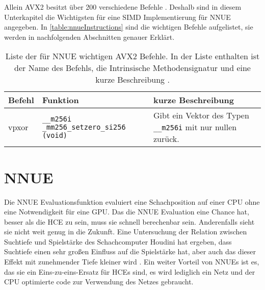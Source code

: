Allein \ac{AVX2} besitzt über 200 verschiedene Befehle \cite{intelIntrinsics}. Deshalb sind in diesem Unterkapitel die Wichtigsten für eine \ac{SIMD} Implementierung für NNUE angegeben. In \autoref{table:nnueInstructions} sind die wichtigen Befehle aufgelistet, sie werden in nachfolgenden Abschnitten genauer Erklärt.

\begin{table}[h]
  \caption{Liste der für \ac{NNUE} wichtigen \ac{AVX2} Befehle. In der Liste enthalten ist der Name des Befehls, die Intrinsische Methodensignatur und eine kurze Beschreibung \cite{intelIntrinsics}.}
  \label{table:nnueInstructions}
  \renewcommand{\arraystretch}{1.2}
  \centering
  \sffamily
  \begin{footnotesize}
    \begin{tabularx}{\textwidth}{l l X}
      \toprule
      \textbf{Befehl} & \textbf{Funktion}                                     & \textbf{kurze Beschreibung} \\
      \midrule
      vpxor           & \lstinline{__m256i _mm256_setzero_si256 (void)} & Gibt ein Vektor des Typen \lstinline{__m256i} mit nur nullen zurück.                               \\
      \bottomrule
    \end{tabularx}
  \end{footnotesize}
  \rmfamily
\end{table}

\section{NNUE}

Die \ac{NNUE} Evaluationsfunktion evaluiert eine Schachposition auf einer CPU ohne eine Notwendigkeit für eine GPU. Das die \ac{NNUE} Evaluation eine Chance hat, besser als die \ac{HCE} zu sein, muss sie schnell berechenbar sein. Anderenfalls sieht sie nicht weit genug in die Zukunft. Eine Untersuchung der Relation zwischen Suchtiefe und Spielstärke des Schachcomputer Houdini \citeyear{Ferreira2013} hat ergeben, dass Suchtiefe einen sehr großen Einfluss auf die Spielstärke hat, aber auch das dieser Effekt mit zunehmender Tiefe kleiner wird \cite{Ferreira2013}. Ein weiter Vorteil von \acp{NNUE} ist es, das sie ein Eins-zu-eins-Ersatz für \acp{HCE} sind, es wird lediglich ein Netz und der CPU optimierte code zur Verwendung des Netzes gebraucht.


